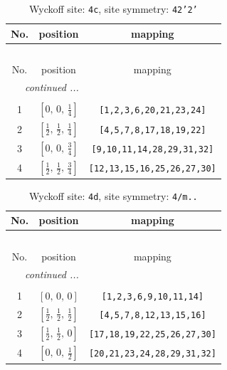 \documentclass[fleqn,8pt]{jsarticle}
\begin{document}
\renewcommand{\arraystretch}{1.2}
\begin{longtable}{ccc}
\caption{Wyckoff site: {\tt 4c}, site symmetry: {\tt 42'2'}}
 \\
 \hline \hline
No. & position & mapping \\ \hline \endfirsthead

\multicolumn{2}{l}{\tablename\ \thetable{}} \\
 \hline \hline
No. & position & mapping \\ \hline \endhead

 \hline \hline
\multicolumn{2}{r}{\footnotesize\it continued ...} \\ \endfoot

 \hline \hline
\multicolumn{2}{r}{} \\ \endlastfoot

1 & $\left[ 0,\, 0,\, \frac{1}{4} \right]$ & {\tt [1,2,3,6,20,21,23,24]} \\ \hline
2 & $\left[ \frac{1}{2},\, \frac{1}{2},\, \frac{1}{4} \right]$ & {\tt [4,5,7,8,17,18,19,22]} \\ \hline
3 & $\left[ 0,\, 0,\, \frac{3}{4} \right]$ & {\tt [9,10,11,14,28,29,31,32]} \\ \hline
4 & $\left[ \frac{1}{2},\, \frac{1}{2},\, \frac{3}{4} \right]$ & {\tt [12,13,15,16,25,26,27,30]} \\
\end{longtable}
\renewcommand{\arraystretch}{1.2}
\begin{longtable}{ccc}
\caption{Wyckoff site: {\tt 4d}, site symmetry: {\tt 4/m..}}
 \\
 \hline \hline
No. & position & mapping \\ \hline \endfirsthead

\multicolumn{2}{l}{\tablename\ \thetable{}} \\
 \hline \hline
No. & position & mapping \\ \hline \endhead

 \hline \hline
\multicolumn{2}{r}{\footnotesize\it continued ...} \\ \endfoot

 \hline \hline
\multicolumn{2}{r}{} \\ \endlastfoot

1 & $\left[ 0,\, 0,\, 0 \right]$ & {\tt [1,2,3,6,9,10,11,14]} \\ \hline
2 & $\left[ \frac{1}{2},\, \frac{1}{2},\, \frac{1}{2} \right]$ & {\tt [4,5,7,8,12,13,15,16]} \\ \hline
3 & $\left[ \frac{1}{2},\, \frac{1}{2},\, 0 \right]$ & {\tt [17,18,19,22,25,26,27,30]} \\ \hline
4 & $\left[ 0,\, 0,\, \frac{1}{2} \right]$ & {\tt [20,21,23,24,28,29,31,32]} \\
\end{longtable}
\end{document}
